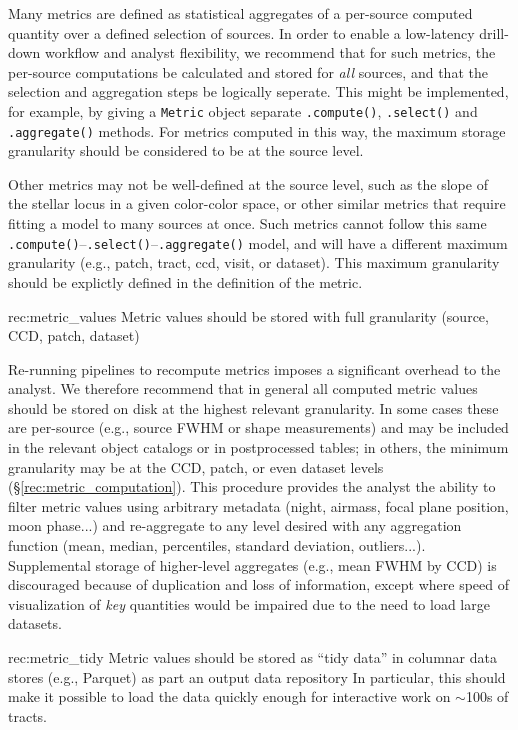 Many metrics are defined as statistical aggregates of a per-source computed quantity over a defined selection of sources.
In order to enable a low-latency drill-down workflow and analyst flexibility, we recommend that for such metrics, the per-source computations be calculated and stored for \emph{all} sources, and that the selection and aggregation steps be logically seperate.
This might be implemented, for example, by giving a \texttt{Metric} object separate \texttt{.compute()}, \texttt{.select()} and \texttt{.aggregate()} methods.
For metrics computed in this way, the maximum storage granularity should be considered to be at the source level.

Other metrics may not be well-defined at the source level, such as the slope of the stellar locus in a given color-color space, or other similar metrics that require fitting a model to many sources at once.
Such metrics cannot follow this same \texttt{.compute()}--\texttt{.select()}--\texttt{.aggregate()} model, and will have a different maximum granularity (e.g., patch, tract, ccd, visit, or dataset).
This maximum granularity should be explictly defined in the definition of the metric.

\begin{recommendation}
    {rec:metric_values}
    {Metric values should be stored with full granularity (source, CCD, patch, dataset)}
\end{recommendation}

Re-running pipelines to recompute metrics imposes a significant overhead to the analyst.
We therefore recommend that in general all computed metric values should be stored on disk at the highest relevant granularity.
In some cases these are per-source (e.g., source FWHM or shape measurements) and may be included in the relevant object catalogs or in postprocessed tables; in others, the minimum granularity may be at the CCD, patch, or even dataset levels (\S \ref{rec:metric_computation}).
This procedure provides the analyst the ability to filter metric values using arbitrary metadata (night, airmass, focal plane position, moon phase...) and re-aggregate to any level desired with any aggregation function (mean, median, percentiles, standard deviation, outliers...).
Supplemental storage of higher-level aggregates (e.g., mean FWHM by CCD) is discouraged because of duplication and loss of information, except where speed of visualization of \emph{key} quantities would be impaired due to the need to load large datasets.


\begin{recommendation}
    {rec:metric_tidy}
    {Metric values should be stored as ``tidy data'' in columnar data stores (e.g., Parquet) as part an output data repository}
In particular, this should make it possible to load the data quickly enough for interactive work on $\sim$100s of tracts.
\end{recommendation}

